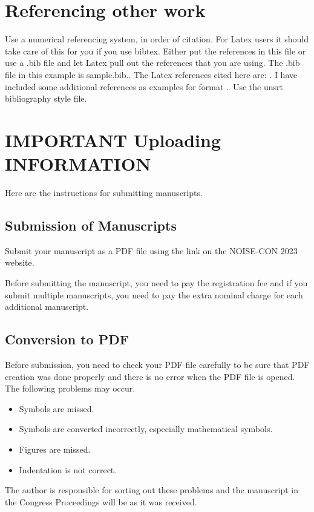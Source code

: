 \documentclass[letterpaper,12pt]{article}
\begin{document}
\section{Referencing other work}
\noindent
Use a numerical referencing system, in order of citation.  For Latex users it should take care of this for you if you use bibtex.   Either put the references in this file or use a .bib file and let Latex pull out the references that you are using.  The .bib file in this example is sample.bib..  The Latex references cited here are:  \cite{latexcompanion, knuthwebsite}.  I have included some additional references as examples for format \cite{Poulsen1, Ryherd2007, Tang2006, May96,  Zwicker_Fastl_2006, ANSI_S3_4}.\ Use the unsrt bibliography style file.  

\section{IMPORTANT Uploading INFORMATION}
\noindent
Here are the instructions for submitting manuscripts. 
\subsection{Submission of Manuscripts}
\noindent
Submit your manuscript as a PDF file using the link on the NOISE-CON 2023 website. 

Before submitting the manuscript, you need to pay the registration fee and if you submit multiple manuscripts, you need to pay the extra nominal charge for each additional manuscript.

\subsection{Conversion to PDF}
\noindent
Before submission, you need to check your PDF file carefully to be sure that PDF creation was done properly and there is no error when the PDF file is opened. The following problems may occur.
\begin{itemize}[noitemsep]
\item
Symbols are missed.
\item
Symbols are converted incorrectly, especially mathematical symbols.
\item
Figures are missed.
\item
Indentation is not correct.
\end{itemize}

\noindent
The author is responsible for sorting out these problems and the manuscript  in the Congress Proceedings will be as it was received.
\end{document}
